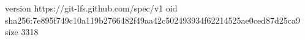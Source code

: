 version https://git-lfs.github.com/spec/v1
oid sha256:7e895f749c10a119b2766482f49aa42c502493934f62214525ae0ced87d25ca9
size 3318
